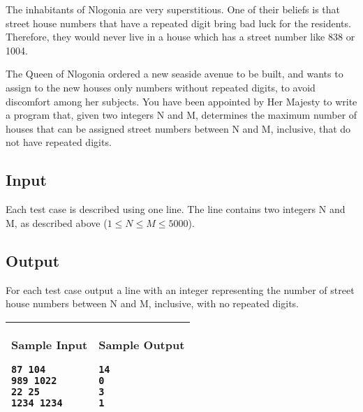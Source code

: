 The inhabitants of Nlogonia are very superstitious. One of their beliefs is
that street house numbers that have a repeated digit bring bad luck for the
residents. Therefore, they would never live in a house which has a street
number like 838 or 1004.

The Queen of Nlogonia ordered a new seaside avenue to be built, and wants to
assign to the new houses only numbers without repeated digits, to avoid
discomfort among her subjects. You have been appointed by Her Majesty to
write a program that, given two integers N and M, determines the maximum
number of houses that can be assigned street numbers between N and M,
inclusive, that do not have repeated digits.

\subsection*{Input}

Each test case is described using one line. The line contains two integers N
and M, as described above ($1 \le N \le M \le 5000$).

\subsection*{Output}

For each test case output a line with an integer representing the number of
street house numbers between N and M, inclusive, with no repeated digits.

\begin{table}[!h]
\centering
\begin{tabular}{|l|l|}
\hline
\begin{minipage}[t]{3in}
\textbf{Sample Input}
\begin{verbatim}
87 104
989 1022
22 25
1234 1234
\end{verbatim}
\vspace{1mm}
\end{minipage}
&

\begin{minipage}[t]{3in}
\textbf{Sample Output}
\begin{verbatim}
14
0
3
1
\end{verbatim}
\vspace{1mm}
\end{minipage} \\
\hline
\end{tabular}
\end{table}

\newpage

